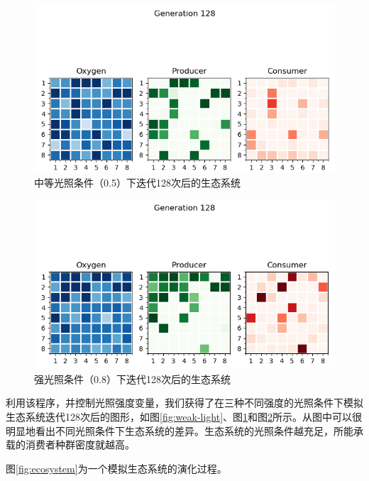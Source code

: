 \documentclass{ctexart}
\begin{document}
\begin{figure}[ht]
  \centering
  \includegraphics[scale=0.75]{medium-light.png}
  \caption{中等光照条件（0.5）下迭代128次后的生态系统}
  \label{fig:medium-light}
\end{figure}

\begin{figure}[ht]
  \centering
  \includegraphics[scale=0.75]{abundant-light.png}
  \caption{强光照条件（0.8）下迭代128次后的生态系统}
  \label{fig:abundant-light}
\end{figure}

利用该程序，并控制光照强度变量，我们获得了在三种不同强度的光照条件下模拟生态系统迭代128次后的图形，如图\ref{fig:weak-light}、图\ref{fig:medium-light}和图\ref{fig:abundant-light}所示。从图中可以很明显地看出不同光照条件下生态系统的差异。生态系统的光照条件越充足，所能承载的消费者种群密度就越高。

图\ref{fig:ecosystem}为一个模拟生态系统的演化过程。
\end{document}
